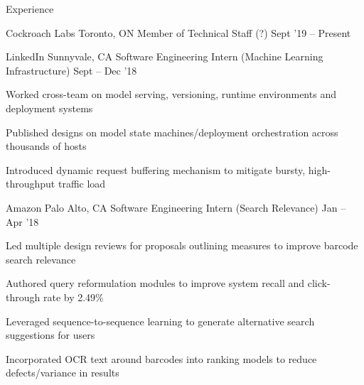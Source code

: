 \documentclass{resume} %
\begin{document}
\begin{rSection}{Experience}
  \begin{rEmptyWorkSection}{Cockroach Labs}
                           {Toronto, ON}
                           {Member of Technical Staff (?)}
                           {Sept '19 -- Present}
  \end{rEmptyWorkSection}

  \begin{rWorkSection}{LinkedIn}
                      {Sunnyvale, CA}
                      {Software Engineering Intern (Machine Learning Infrastructure)}
                      {Sept -- Dec '18}
  {
    \item Worked cross-team on model serving, versioning, runtime environments and
      deployment systems
    \item Published designs on model state
      machines/deployment orchestration across thousands of hosts
    \item Introduced dynamic request buffering mechanism to mitigate bursty,
      high-throughput traffic load
  }
  \end{rWorkSection}

  \begin{rWorkSection}{Amazon}
                     {Palo Alto, CA}
                     {Software Engineering Intern (Search Relevance)}
                     {Jan -- Apr '18}
  {
    \item Led multiple design reviews for proposals outlining measures to
      improve barcode search relevance
    \item Authored query reformulation modules to improve system recall and
      click-through rate by 2.49\%
    \item Leveraged sequence-to-sequence learning to generate alternative
      search suggestions for users
    \item Incorporated OCR text around barcodes into ranking models to reduce
      defects/variance in results
  }
  \end{rWorkSection}


\end{rSection}
\end{document}
